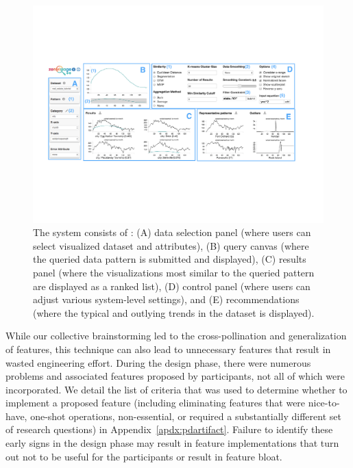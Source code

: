  \begin{figure}[ht!]
   \centering
   \vspace{-5pt}
   \includegraphics[width=0.9\linewidth]{figures/zvpp_system.pdf} %
   \vspace{-5pt}\caption{The \zvpp system consists of : (A) data selection panel (where users can select visualized dataset and attributes), (B) query canvas (where the queried data pattern is submitted and displayed), (C) results panel (where the visualizations most similar to the queried pattern are displayed as a ranked list), (D) control panel (where users can adjust various system-level settings), and (E) recommendations (where the typical and outlying trends in the dataset is displayed).}
   \label{zvOverview}
   \vspace*{-10pt}
 \end{figure}
 \par While our collective brainstorming led to the cross-pollination and generalization of features, this technique can also lead to unnecessary features that result in wasted engineering effort. During the design phase, there were numerous problems and associated features proposed by participants, not all of which were incorporated. We detail the list of criteria that was used to determine whether to implement a proposed feature (including eliminating features that were nice-to-have, one-shot operations, non-essential, or required a substantially different set of research questions) in Appendix~\ref{apdx:pdartifact}. Failure to identify these early signs in the design phase may result in feature implementations that turn out not to be useful for the participants or result in feature bloat.
